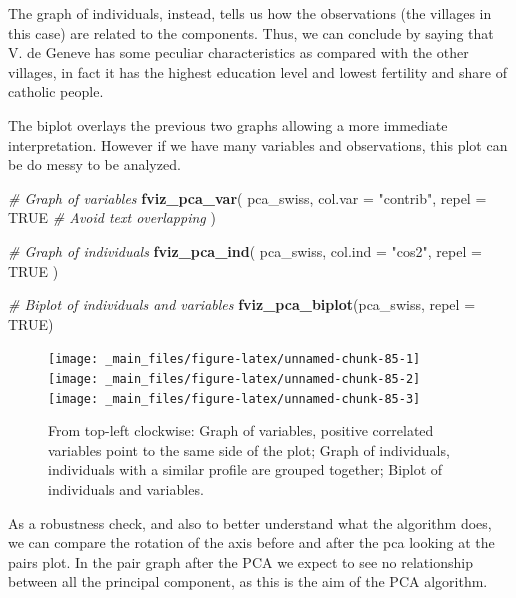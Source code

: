 \documentclass[
]{svmono}
\newenvironment{Shaded}{\begin{snugshade}}{\end{snugshade}}
\newcommand{\AttributeTok}[1]{\textcolor[rgb]{0.13,0.29,0.53}{#1}}
\newcommand{\CommentTok}[1]{\textcolor[rgb]{0.56,0.35,0.01}{\textit{#1}}}
\newcommand{\ConstantTok}[1]{\textcolor[rgb]{0.56,0.35,0.01}{#1}}
\newcommand{\FunctionTok}[1]{\textcolor[rgb]{0.13,0.29,0.53}{\textbf{#1}}}
\newcommand{\NormalTok}[1]{#1}
\newcommand{\StringTok}[1]{\textcolor[rgb]{0.31,0.60,0.02}{#1}}
\begin{document}
The graph of individuals, instead, tells us how the observations (the
villages in this case) are related to the components. Thus, we can
conclude by saying that V. de Geneve has some peculiar characteristics
as compared with the other villages, in fact it has the highest
education level and lowest fertility and share of catholic people.

The biplot overlays the previous two graphs allowing a more immediate
interpretation. However if we have many variables and observations, this
plot can be do messy to be analyzed.

\begin{Shaded}
\begin{Highlighting}[]
\CommentTok{\# Graph of variables}
\FunctionTok{fviz\_pca\_var}\NormalTok{(}
\NormalTok{        pca\_swiss,}
        \AttributeTok{col.var =} \StringTok{"contrib"}\NormalTok{,}
        \AttributeTok{repel =} \ConstantTok{TRUE}     \CommentTok{\# Avoid text overlapping}
\NormalTok{)}

\CommentTok{\# Graph of individuals}
\FunctionTok{fviz\_pca\_ind}\NormalTok{(}
\NormalTok{        pca\_swiss,}
        \AttributeTok{col.ind =} \StringTok{"cos2"}\NormalTok{,}
        \AttributeTok{repel =} \ConstantTok{TRUE}
\NormalTok{)}

\CommentTok{\# Biplot of individuals and variables}
\FunctionTok{fviz\_pca\_biplot}\NormalTok{(pca\_swiss, }\AttributeTok{repel =} \ConstantTok{TRUE}\NormalTok{)}
\end{Highlighting}
\end{Shaded}

\begin{figure}[H]
\texttt{[image: \_main\_files/figure-latex/unnamed-chunk-85-1]} \texttt{[image: \_main\_files/figure-latex/unnamed-chunk-85-2]} \texttt{[image: \_main\_files/figure-latex/unnamed-chunk-85-3]} \caption{From top-left clockwise: Graph of variables, positive correlated variables point to the same side of the plot; Graph of individuals, individuals with a similar profile are grouped together; Biplot of individuals and variables.}\label{fig:unnamed-chunk-85}
\end{figure}

As a robustness check, and also to better understand what the algorithm
does, we can compare the rotation of the axis before and after the pca
looking at the pairs plot. In the pair graph after the PCA we expect to
see no relationship between all the principal component, as this is the
aim of the PCA algorithm.
\end{document}
